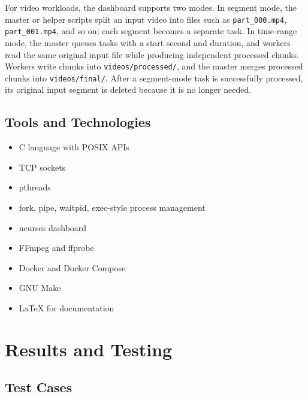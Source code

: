 \documentclass[12pt,a4paper]{article}
\begin{document}
For video workloads, the dashboard supports two modes. In segment mode, the master or helper scripts split an input video into files such as \texttt{part\_000.mp4}, \texttt{part\_001.mp4}, and so on; each segment becomes a separate task. In time-range mode, the master queues tasks with a start second and duration, and workers read the same original input file while producing independent processed chunks. Workers write chunks into \texttt{videos/processed/}, and the master merges processed chunks into \texttt{videos/final/}. After a segment-mode task is successfully processed, its original input segment is deleted because it is no longer needed.

\subsection{Tools and Technologies}

\begin{itemize}[noitemsep]
    \item C language with POSIX APIs
    \item TCP sockets
    \item pthreads
    \item fork, pipe, waitpid, exec-style process management
    \item ncurses dashboard
    \item FFmpeg and ffprobe
    \item Docker and Docker Compose
    \item GNU Make
    \item LaTeX for documentation
\end{itemize}

\section{Results and Testing}

\subsection{Test Cases}
\end{document}

